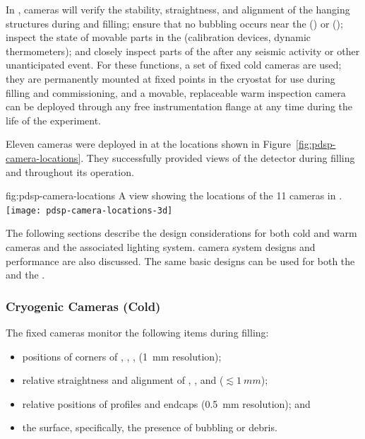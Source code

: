 In , cameras will verify the stability, straightness,
and alignment of the hanging  structures during \cooldown and
filling; ensure that no bubbling occurs near the 
(\single) or  (\dual);  inspect the
state of movable parts in the  (calibration devices, dynamic
thermometers); and  closely inspect parts of the  after any seismic activity or other unanticipated
event.  For these functions, a set of fixed
cold cameras are used; they are permanently mounted at fixed points in the cryostat
for use during filling and commissioning, and a movable, replaceable
warm inspection camera can be deployed through any free
instrumentation flange at any time during the life of the
experiment. 

Eleven cameras were deployed in  at the locations shown in Figure~\ref{fig:pdsp-camera-locations}. They successfully provided views of the detector during filling and throughout %
its operation. %

\begin{dunefigure}{fig:pdsp-camera-locations}
  {A \threed view showing the locations of the 11 cameras in .}
  \texttt{[image: pdsp-camera-locations-3d]}%
\end{dunefigure}

The following sections describe the design considerations for both cold
and warm cameras and the associated lighting system.  camera system designs and performance are also discussed.  
The same basic
designs can be used for both the  and the . %



\subsubsection{Cryogenic Cameras (Cold)}

The fixed cameras
monitor the following items during filling:
\begin{itemize}
\item positions of corners of , , ,  (\SI{1}{mm} resolution);
\item relative straightness and alignment of , , and  (\(\lesssim\SI{1}{mm}\));
\item relative positions of profiles and endcaps (\SI{0.5}{mm} resolution); and 
\item the  surface, specifically, the presence of bubbling or debris.
\end{itemize}




